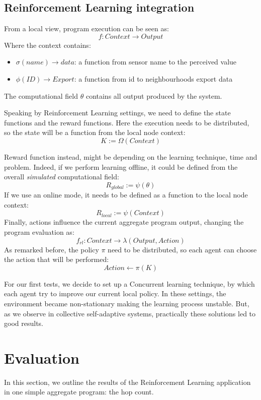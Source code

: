 \documentclass[conference]{IEEEtran}
\begin{document}
\subsection{Reinforcement Learning integration}
From a local view, program execution can be seen as:
$$
f : \textit{Context} \rightarrow \textit{Output}
$$
Where the context contains:
\begin{itemize}
  \item $\sigma(name) \rightarrow \textit{data}$: a function from sensor name to the perceived value
  \item $\phi(\textit{ID}) \rightarrow \textit{Export}$: a function from id to neighbourhoods export data
\end{itemize}
The computational field $\theta$ contains all output produced by the system.

Speaking by Reinforcement Learning settings, we need to define the state functions and the reward functions.
%
Here the execution needs to be distributed, so the state will be a function from the local node context:
$$
K := \Omega(\textit{Context})
$$

Reward function instead, might be depending on the learning technique, time and problem. 
 Indeed, if we perform learning offline, it could be defined from the overall \textit{simulated} computational field:
$$
\textit{R}_{global} := \psi({\theta})
$$
If we use an online mode, it needs to be defined as a function to the local node context:
$$
\textit{R}_{local} := \psi(\textit{Context})
$$
Finally, actions influence the current aggregate program output, changing the program evaluation as:
$$
f_{rl} : \textit{Context} \rightarrow \lambda(\textit{Output}, \textit{Action})
$$
As remarked before, the policy $\pi$ need to be distributed, so each agent can choose the action that will be performed:
$$
\textit{Action} \leftarrow \pi(K)
$$

For our first tests, 
 we decide to set up a Concurrent learning technique, by which each agent try to improve our current local policy.
%
In these settings, the environment became non-stationary making the learning process unstable.
 But, as we observe in collective self-adaptive systems, practically these solutions led to good results.

\section{Evaluation}
In this section, we outline the results of the Reinforcement Learning application in one simple
 aggregate program: the hop count.
\end{document}
